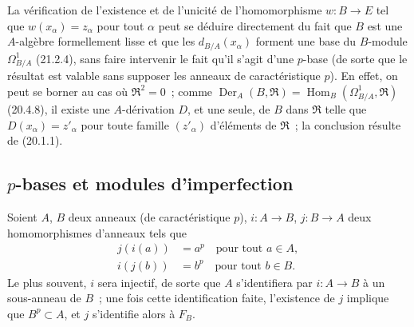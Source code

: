 \begin{remark}[21.2.8]
\label{0.21.2.8-fr}
La vérification de l'existence et de l'unicité de l'homomorphisme $w:B\to E$
tel que $w(x_\alpha)=z_\alpha$ pour tout $\alpha$ peut se déduire directement
du fait que $B$ est une $A$-algèbre formellement lisse et que les
$d_{B/A}(x_\alpha)$ forment une base du $B$-module $\Omega^1_{B/A}$ (21.2.4),
sans faire intervenir le fait qu'il s'agit d'une $p$-base (de sorte que le
résultat est valable sans supposer les anneaux de caractéristique $p$).
En effet, on peut se borner au cas où $\mathfrak R^2=0$~; comme
$\operatorname{Der}_A(B,\mathfrak R)=\operatorname{Hom}_B(\Omega^1_{B/A},\mathfrak R)$
(20.4.8), il existe une $A$-dérivation $D$, et une seule, de $B$ dans
$\mathfrak R$ telle que $D(x_\alpha)=z'_\alpha$ pour toute famille
$(z'_\alpha)$ d'éléments de $\mathfrak R$~; la conclusion résulte de (20.1.1).
\end{remark}

\subsection{$p$-bases et modules d'imperfection}
\label{0.21.3-fr}

\begin{env}[21.3.1]
\label{0.21.3.1-fr}
Soient $A$, $B$ deux anneaux (de caractéristique $p$), $i:A\to B$,
$j:B\to A$ deux homomorphismes d'anneaux tels que
\begin{align}
\tag{21.3.1.1}\label{0.21.3.1.1-fr}
j(i(a))&=a^p\quad\text{pour tout }a\in A,\\
\tag{21.3.1.2}\label{0.21.3.1.2-fr}
i(j(b))&=b^p\quad\text{pour tout }b\in B.
\end{align}
Le plus souvent, $i$ sera injectif, de sorte que $A$ s'identifiera par
$i:A\to B$ à un sous-anneau de $B$~; une fois cette identification faite,
l'existence de $j$ implique que $B^p\subset A$, et $j$ s'identifie alors à $F_B$.
\end{env}

